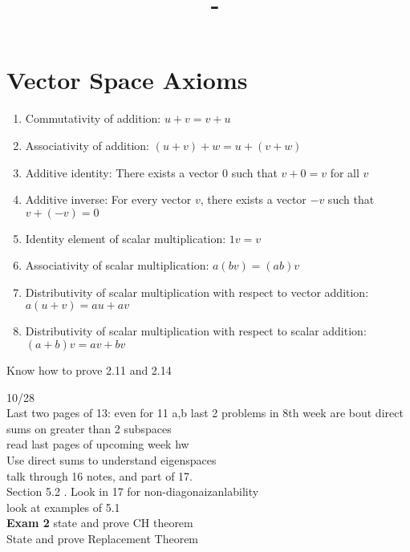 \documentclass[answers,12pt,addpoints]{exam}
\author{\name}
\title{\course \ - \assignment}
\begin{document}
\maketitle
\tableofcontents
\newpage

\section{Vector Space Axioms}

\begin{enumerate}
    \item Commutativity of addition: $u+v = v+u$
    \item Associativity of addition: $(u+v)+w = u+(v+w)$
    \item Additive identity: There exists a vector $0$ such that $v+0 = v$ for all $v$
    \item Additive inverse: For every vector $v$, there exists a vector $-v$ such that $v+(-v) = 0$
    \item Identity element of scalar multiplication: $1v = v$
    \item Associativity of scalar multiplication: $a(bv) = (ab)v$
    \item Distributivity of scalar multiplication with respect to vector addition: $a(u+v) = au + av$
    \item Distributivity of scalar multiplication with respect to scalar addition: $(a+b)v = av + bv$
\end{enumerate}

Know how to prove 2.11 and 2.14

\newpage

10/28\\
Last two pages of 13: 
even for 11 a,b 
last 2 problems in 8th week are bout direct sums on greater than 2 subspaces\\ 
read last pages of upcoming week hw\\
Use direct sums to understand eigenspaces \\
talk through 16 notes, and part of 17.\\
Section 5.2 . Look in 17 for non-diagonaizanlability\\
look at examples of 5.1\\ 


\newpage
\textbf{Exam 2}
state and prove CH theorem\\
State and prove Replacement Theorem\\
\end{document}
